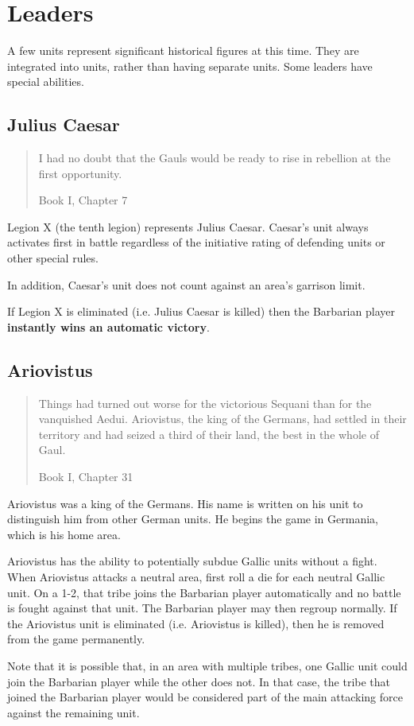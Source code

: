 \section{Leaders}
\par
A few units represent significant historical figures at this time. They are integrated into units, rather than having separate units. Some leaders have special abilities.

\subsection{Julius Caesar}
\blockquote[Book I, Chapter 7]{I had no doubt that the Gauls would be ready to rise in rebellion at the first opportunity.}
\par
Legion X (the tenth legion) represents Julius Caesar. Caesar’s unit always activates first in battle regardless of the initiative rating of defending units or other special rules.

In addition, Caesar’s unit does not count against an area’s garrison limit.

If Legion X is eliminated (i.e. Julius Caesar is killed) then the Barbarian player \textbf{instantly wins an automatic victory}.

\subsection{Ariovistus}
\blockquote[Book I, Chapter 31]{Things had turned out worse for the victorious Sequani than for the vanquished Aedui. Ariovistus, the king of the Germans, had settled in their territory and had seized a third of their land, the best in the whole of Gaul.}
\par
Ariovistus was a king of the Germans. His name is written on his unit to distinguish him from other German units. He begins the game in Germania, which is his home area.

Ariovistus has the ability to potentially subdue Gallic units without a fight. When Ariovistus attacks a neutral area, first roll a die for each neutral Gallic unit. On a 1-2, that tribe joins the Barbarian player automatically and no battle is fought against that unit. The Barbarian player may then regroup normally. If the Ariovistus unit is eliminated (i.e. Ariovistus is killed), then he is removed from the game permanently.

Note that it is possible that, in an area with multiple tribes, one Gallic unit could join the Barbarian player while the other does not. In that case, the tribe that joined the Barbarian player would be considered part of the main attacking force against the remaining unit.

